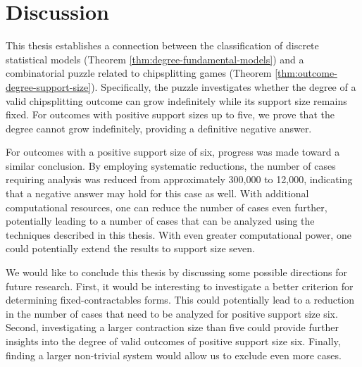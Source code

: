 \chapter{Discussion}

This thesis establishes a connection between the classification of discrete statistical models (Theorem \ref{thm:degree-fundamental-models}) and a combinatorial puzzle related to chipsplitting games (Theorem \ref{thm:outcome-degree-support-size}). Specifically, the puzzle investigates whether the degree of a valid chipsplitting outcome can grow indefinitely while its support size remains fixed. For outcomes with positive support sizes up to five, we prove that the degree cannot grow indefinitely, providing a definitive negative answer.

For outcomes with a positive support size of six, progress was made toward a similar conclusion. By employing systematic reductions, the number of cases requiring analysis was reduced from approximately 300,000 to 12,000, indicating that a negative answer may hold for this case as well. With additional computational resources, one can reduce the number of cases even further, potentially leading to a number of cases that can be analyzed using the techniques described in this thesis. With even greater computational power, one could potentially extend the results to support size seven.

We would like to conclude this thesis by discussing some possible directions for future research. First, it would be interesting to investigate a better criterion for determining fixed-contractables forms. This could potentially lead to a reduction in the number of cases that need to be analyzed for positive support size six. Second, investigating a larger contraction size than five could provide further insights into the degree of valid outcomes of positive support size six. Finally, finding a larger non-trivial system would allow us to exclude even more cases.